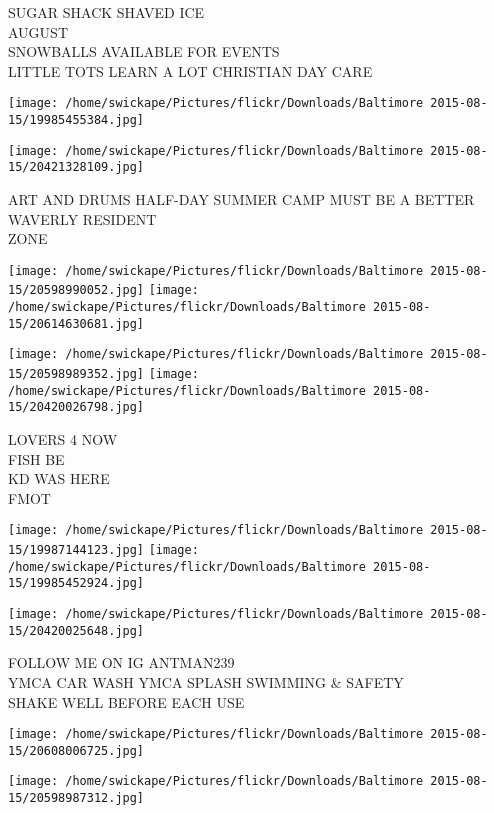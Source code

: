 \documentclass[10pt,letterpaper]{article}
\begin{document}
SUGAR SHACK SHAVED ICE\\
AUGUST\\
SNOWBALLS AVAILABLE FOR EVENTS\\
LITTLE TOTS LEARN A LOT CHRISTIAN DAY CARE
\pagebreak

\texttt{[image: /home/swickape/Pictures/flickr/Downloads/Baltimore 2015-08-15/19985455384.jpg]}

\vspace{0.25in}
\texttt{[image: /home/swickape/Pictures/flickr/Downloads/Baltimore 2015-08-15/20421328109.jpg]}

ART AND DRUMS HALF{-}DAY SUMMER CAMP MUST BE A BETTER WAVERLY RESIDENT\\
ZONE
\pagebreak

\texttt{[image: /home/swickape/Pictures/flickr/Downloads/Baltimore 2015-08-15/20598990052.jpg]}
\texttt{[image: /home/swickape/Pictures/flickr/Downloads/Baltimore 2015-08-15/20614630681.jpg]}

\texttt{[image: /home/swickape/Pictures/flickr/Downloads/Baltimore 2015-08-15/20598989352.jpg]}
\texttt{[image: /home/swickape/Pictures/flickr/Downloads/Baltimore 2015-08-15/20420026798.jpg]}

LOVERS 4 NOW\\
FISH BE\\
KD WAS HERE\\
FMOT
\pagebreak

\texttt{[image: /home/swickape/Pictures/flickr/Downloads/Baltimore 2015-08-15/19987144123.jpg]}
\texttt{[image: /home/swickape/Pictures/flickr/Downloads/Baltimore 2015-08-15/19985452924.jpg]}

\vspace{0.25in}
\texttt{[image: /home/swickape/Pictures/flickr/Downloads/Baltimore 2015-08-15/20420025648.jpg]}

FOLLOW ME ON IG ANTMAN239\\
YMCA CAR WASH YMCA SPLASH SWIMMING \& SAFETY\\
SHAKE WELL BEFORE EACH USE
\pagebreak

\texttt{[image: /home/swickape/Pictures/flickr/Downloads/Baltimore 2015-08-15/20608006725.jpg]}

\vspace{0.25in}
\texttt{[image: /home/swickape/Pictures/flickr/Downloads/Baltimore 2015-08-15/20598987312.jpg]}
\end{document}
